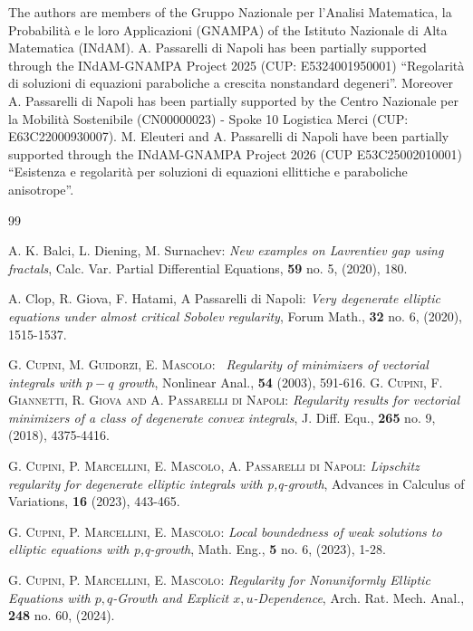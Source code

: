 \documentclass[12pt]{amsart}
\theoremstyle{definition}
\numberwithin{equation}{section}
\numberwithin{equation}{section}
\begin{document}
{\vspace{10mm}

 The authors are members of the Gruppo Nazionale per l’Analisi Matematica,
la Probabilità e le loro Applicazioni (GNAMPA) of the Istituto Nazionale di Alta Matematica (INdAM). 
A. Passarelli di Napoli has been partially supported through the INdAM-GNAMPA Project 2025 (CUP: E5324001950001) ``Regolarità di soluzioni di equazioni paraboliche a crescita nonstandard degeneri''.
Moreover A. Passarelli di Napoli has been partially supported  by the Centro Nazionale per la Mobilità Sostenibile (CN00000023) - Spoke 10 Logistica Merci (CUP: E63C22000930007). M. Eleuteri and  A. Passarelli di Napoli have been partially supported through the INdAM-GNAMPA Project 2026 (CUP E53C25002010001) ``Esistenza e regolarità per soluzioni di equazioni ellittiche e paraboliche anisotrope''.



\begin{thebibliography}{99}



 {\sc A. K. Balci, L. Diening, M. Surnachev:} \emph{New examples on Lavrentiev gap using fractals}, Calc. Var. Partial Differential Equations, {\bf 59} no. 5, (2020),  180.

 {\sc A. Clop, R. Giova, F. Hatami, A Passarelli di Napoli:} \emph{Very degenerate elliptic equations under almost critical Sobolev regularity}, Forum Math., {\bf 32} no. 6, (2020), 1515-1537. 

 \textsc{G. Cupini, M. Guidorzi, E.  Mascolo:} \emph{\ Regularity of
minimizers of vectorial integrals with $p-q$ growth}, Nonlinear Anal., {\bf 54} (2003), 591-616.
 \textsc{G. Cupini, F. Giannetti, R. Giova and A. Passarelli di Napoli:} \emph{Regularity results for vectorial minimizers of a class of
degenerate convex integrals}, J. Diff. Equ., {\bf 265}  no. 9, (2018), 4375-4416.

 \textsc{G. Cupini, P. Marcellini, E. Mascolo, A. Passarelli di Napoli}: \emph{Lipschitz regularity for degenerate elliptic integrals with p,q-growth}, Advances in Calculus of Variations, {\bf 16} (2023), 443-465.

 \textsc{G. Cupini, P. Marcellini, E. Mascolo}: \emph{Local boundedness of weak solutions to elliptic equations with p,q-growth}, Math. Eng., {\bf 5} no. 6, (2023), 1-28.


 \textsc{G. Cupini, P. Marcellini, E. Mascolo:} \emph{Regularity for Nonuniformly Elliptic Equations with $p,q$-Growth and Explicit $x,u$-Dependence}, Arch. Rat. Mech. Anal., {\bf 248} no. 60, (2024).


\end{thebibliography}}
\end{document}
